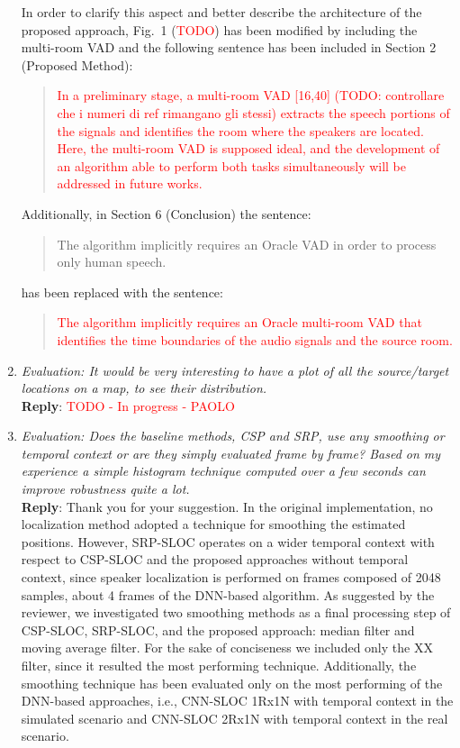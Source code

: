 \documentclass[11pt, technote, letterpaper, oneside, onecolumn]{IEEEtran}
\begin{document}
\begin{enumerate}
In order to clarify this aspect and better describe the architecture of the proposed approach, Fig.~1 (\textcolor{red}{TODO}) has been modified by including the multi-room VAD and the following sentence has been included in Section 2 (Proposed Method):
\begin{quote}
\textcolor{red}{
In a preliminary stage, a multi-room VAD [16,40] (\textcolor{red}{TODO: controllare che i numeri di ref rimangano gli stessi}) extracts the speech portions of the signals and identifies the room where the speakers are located. Here, the multi-room VAD is supposed ideal, and the development of an algorithm able to perform both tasks simultaneously will be addressed in future works.}
\end{quote}

Additionally, in Section 6 (Conclusion) the sentence:
\begin{quote}
The algorithm implicitly requires an Oracle VAD in order to process only human
speech.
\end{quote}

has been replaced with the sentence:
\begin{quote}
\textcolor{red}{The algorithm implicitly requires an Oracle multi-room VAD that identifies the time boundaries of the audio signals and the source room.}
 \end{quote}
 
\item \textit{Evaluation: It would be very interesting to have a plot of all the source/target locations on a map, to see their distribution.\\}
\textbf{Reply}: \textcolor{red}{TODO - In progress - PAOLO}

\item \textit{Evaluation: Does the baseline methods, CSP and SRP, use any smoothing or temporal context or are they simply evaluated frame by frame? Based on my experience a simple histogram technique computed over a few seconds can improve robustness quite a lot.\\} \label{resp:smooth}
\textbf{Reply}: Thank you for your suggestion. In the original implementation, no localization method adopted a technique for smoothing the estimated positions. However, SRP-SLOC operates on a wider temporal context with respect to CSP-SLOC and the proposed approaches without temporal context, since speaker localization is performed on frames composed of 2048 samples, about 4 frames of the DNN-based algorithm. As suggested by the reviewer, we investigated two smoothing methods as a final processing step of CSP-SLOC, SRP-SLOC, and the proposed approach: median filter and moving average filter. For the sake of conciseness we included only the XX filter, since it resulted the most performing technique. Additionally, the smoothing technique has been evaluated only on the most performing of the DNN-based approaches, i.e., CNN-SLOC 1Rx1N with temporal context in the simulated scenario and CNN-SLOC 2Rx1N with temporal context in the real scenario.


\end{enumerate}
\end{document}
